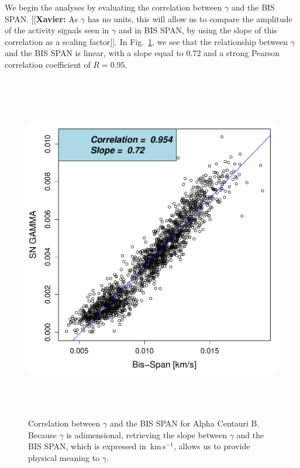 \documentclass[11pt, oneside]{article}
\def\kms{\hbox{\,km\,s$^{-1}$}}       %
\newcommand{\xavier}[1]{{\color{blue}[[\textbf{Xavier: }#1]]}}
\begin{document}
We begin the analyses by evaluating the correlation between $\gamma$ and the BIS SPAN. \xavier{As $\gamma$ has no units, this will allow us to compare the amplitude of the activity signals seen in $\gamma$ and in BIS SPAN, by using the slope of this correlation as a scaling factor}.
In Fig.~\ref{fig:alphacent:corr.gamma}, we see that the relationship between $\gamma$ and the BIS SPAN is linear, with a slope equal to $0.72$ and a strong Pearson correlation coefficient of $R=0.95$.
%
\begin{figure}[htbp]
   \centering
\includegraphics[height = 6in]{HD12862_[2]gamma_vs_bisspan.pdf} 
   \caption{Correlation between $\gamma$ and the BIS SPAN for Alpha Centauri B. Because $\gamma$ is adimensional, retrieving the slope between $\gamma$ and the BIS SPAN, which is expressed in \kms, allows us to provide physical meaning to $\gamma$.}
   \label{fig:alphacent:corr.gamma}
\end{figure}
%
\end{document}

